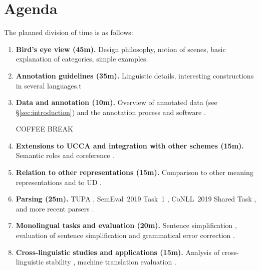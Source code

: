 \documentclass[11pt,a4paper,table]{article}
\begin{document}

\section{Agenda}\label{sec:agenda}

The planned division of time is as follows:

\begin{enumerate}
    \item \textbf{Bird's eye view (45m).}
    Design philosophy, notion of scenes, basic explanation of categories, simple examples.
    \item \textbf{Annotation guidelines (35m).}
    Linguistic details, interesting constructions
    in several languages.t
    \item \textbf{Data and annotation (10m).}
    Overview of annotated data (see \S\ref{sec:introduction})
    and the annotation process and software \cite{abend2017uccaapp}.
    \begin{center}
        COFFEE BREAK
    \end{center}
    \item \textbf{Extensions to UCCA and integration with other schemes (15m).}
    Semantic roles \cite{prange2019made} and
    coreference \cite{prange2019semantically}.
    \item \textbf{Relation to other representations (15m).}
    Comparison to other meaning representations
    \cite{abend2017state,koller2019graph}
    and to UD \cite{hershcovich2019content}.
    \item \textbf{Parsing (25m).}
    TUPA \cite{hershcovich2017a,hershcovich2018multitask},
    SemEval~2019 Task~1 \cite{hershcovich2019shared,jiang-19},
    CoNLL~2019 Shared Task \cite{Oep:Abe:Haj:19}, and
    more recent parsers \cite{zhang2019broad}.
    \item \textbf{Monolingual tasks and evaluation (20m).}
    Sentence simplification \cite{sulem2018simple},
    evaluation of sentence simplification \cite{sulem2018samsa,alvamanchego-etal:2019:easse}
    and grammatical error correction \cite{choshen2018usim}.
    \item \textbf{Cross-linguistic studies and applications (15m).}
    Analysis of cross-linguistic stability \cite{sulem2015conceptual},
    machine translation evaluation \cite{birch2016hume,marecek-etal-2017-cuni}.
\end{enumerate}
\end{document}
